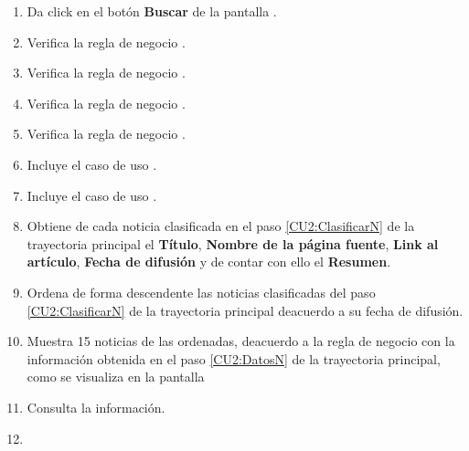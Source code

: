 \begin{enumerate}[1.]

	\item \actor \label{CU2:Buscar}Da click en el botón \textbf{Buscar} de la pantalla .  

	\item \sistema \label{CU2:CamposO}Verifica la regla de negocio . 

	\item \sistema Verifica la regla de negocio . 

	\item \sistema Verifica la regla de negocio . 

	\item \sistema Verifica la regla de negocio .  

	\item \sistema Incluye el caso de uso .

	\item \sistema \label{CU2:ClasificarN}Incluye el caso de uso .

	\item \sistema \label{CU2:DatosN}Obtiene de cada noticia clasificada en el paso \ref{CU2:ClasificarN} de la trayectoria principal el \textbf{Título}, \textbf{Nombre de la página fuente}, \textbf{Link al artículo}, \textbf{Fecha de difusión} y de contar con ello el \textbf{Resumen}.

	\item \sistema \label{CU2:OrdenaN}Ordena de forma descendente las noticias clasificadas del paso \ref{CU2:ClasificarN} de la trayectoria principal deacuerdo a su fecha de difusión.

	\item \sistema Muestra 15 noticias de las ordenadas, deacuerdo a la regla de negocio  con la información obtenida en el paso \ref{CU2:DatosN} de la trayectoria principal, como se visualiza en la pantalla  

	\item \actor \label{CU2:Consulta}Consulta la información.

	\item \finCU	
\end{enumerate}

